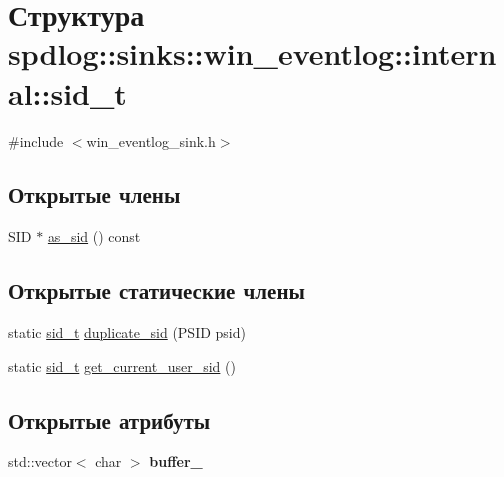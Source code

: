 \hypertarget{structspdlog_1_1sinks_1_1win__eventlog_1_1internal_1_1sid__t}{}\section{Структура spdlog\+:\+:sinks\+:\+:win\+\_\+eventlog\+:\+:internal\+:\+:sid\+\_\+t}
\label{structspdlog_1_1sinks_1_1win__eventlog_1_1internal_1_1sid__t}


{\ttfamily \#include $<$win\+\_\+eventlog\+\_\+sink.\+h$>$}

\subsection*{Открытые члены}
\begin{DoxyCompactItemize}
\item 
S\+ID $\ast$ \hyperlink{structspdlog_1_1sinks_1_1win__eventlog_1_1internal_1_1sid__t_a1b5162419a2f0e134252610f06d00cd6}{as\+\_\+sid} () const
\end{DoxyCompactItemize}
\subsection*{Открытые статические члены}
\begin{DoxyCompactItemize}
\item 
static \hyperlink{structspdlog_1_1sinks_1_1win__eventlog_1_1internal_1_1sid__t}{sid\+\_\+t} \hyperlink{structspdlog_1_1sinks_1_1win__eventlog_1_1internal_1_1sid__t_a3baa3e05ef65fdc703b47e702013505b}{duplicate\+\_\+sid} (P\+S\+ID psid)
\item 
static \hyperlink{structspdlog_1_1sinks_1_1win__eventlog_1_1internal_1_1sid__t}{sid\+\_\+t} \hyperlink{structspdlog_1_1sinks_1_1win__eventlog_1_1internal_1_1sid__t_ad6c8ed4cae2d0aae1d20339c5d4cbf53}{get\+\_\+current\+\_\+user\+\_\+sid} ()
\end{DoxyCompactItemize}
\subsection*{Открытые атрибуты}
\begin{DoxyCompactItemize}
\item 
\mbox{\label{structspdlog_1_1sinks_1_1win__eventlog_1_1internal_1_1sid__t_a06d7af3607477dd79757dfa00bba815f}} 
std\+::vector$<$ char $>$ {\bfseries buffer\+\_\+}
\end{DoxyCompactItemize}


